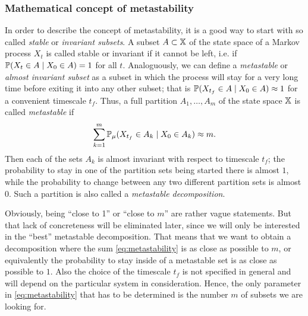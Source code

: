 \subsubsection*{Mathematical concept of metastability}

In order to describe the concept of metastability, it is a good way to start with so called \textit{stable} or \textit{invariant subsets}. A subset $A \subset \mathbb{X}$ of the state space of a Markov process $X_t$ is called stable or invariant if it cannot be left, i.e. if $\mathbb{P}(X_t \in A \mid X_0 \in A) = 1$ for all $t$.
Analoguously, we can define a \textit{metastable} or \textit{almost invariant subset} as a subset in which the process will stay for a very long time before exiting it into any other subset; that is $\mathbb{P}(X_{t_f} \in A \mid X_0 \in A) \approx 1$ for a convenient timescale $t_f$.
Thus, a full partition $A_1,\dots,A_m$ of the state space $\mathbb{X}$ is called \textit{metastable} if
\begin{equation}
\label{eq:metastability}
\sum_{k=1}^m \mathbb{P}_\mu(X_{t_f} \in A_k \mid X_0 \in A_k) \approx m.
\end{equation}
Then each of the sets $A_k$ is almost invariant with respect to timescale $t_f$;
the probability to stay in one of the partition sets being started there is almost $1$, while the probability to change between any two different partition sets is almost $0$.
Such a partition is also called a \textit{metastable decomposition}.

Obviously, being ``close to 1'' or ``close to $m$'' are rather vague statements. But that lack of concreteness will be eliminated later,
since we will only be interested in the ``best'' metastable decomposition.
That means that we want to obtain a decomposition where the sum \eqref{eq:metastability} is as close as possible to $m$, or equivalently the probability to stay inside of a metastable set is as close as possible to $1$.
Also the choice of the timescale $t_f$ is not specified in general and will depend on the particular system in consideration.
Hence, the only parameter in \eqref{eq:metastability} that has to be determined is the number $m$ of subsets we are looking for. 
\\

